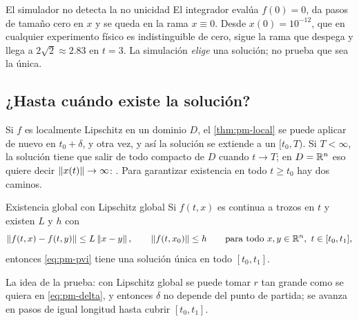 
\begin{trampa}[label=tr:pm-simulador]{El simulador no detecta la no unicidad}
El integrador evalúa $f(0)=0$, da pasos de tamaño cero en $x$ y se queda en la rama $x\equiv0$. Desde $x(0)=10^{-12}$, que en cualquier experimento físico es indistinguible de cero, sigue la rama que despega y llega a $2\sqrt2\approx2.83$ en $t=3$. La simulación \emph{elige} una solución; no prueba que sea la única.
\end{trampa}

\subsection{¿Hasta cuándo existe la solución?}

Si $f$ es localmente Lipschitz en un dominio $D$, el \cref{thm:pm-local} se puede aplicar de nuevo en $t_0+\delta$, y otra vez, y así la solución se extiende a un  $[t_0,T)$. Si $T<\infty$, la solución tiene que salir de todo compacto de $D$ cuando $t\to T$; en $D=\mathbb{R}^n$ eso quiere decir $\left\lVert x(t)\right\rVert\to\infty$: . Para garantizar existencia en todo $t\ge t_0$ hay dos caminos.

\begin{teorema}[label=thm:pm-global]{Existencia global con Lipschitz global \citep[Teorema~3.2]{Kha02}}
Si $f(t,x)$ es continua a trozos en $t$ y existen $L$ y $h$ con
\[
  \left\lVert f(t,x)-f(t,y)\right\rVert\le L\left\lVert x-y\right\rVert,\qquad\left\lVert f(t,x_0)\right\rVert\le h\qquad\text{para todo }x,y\in\mathbb{R}^n,\ t\in[t_0,t_1],
\]
entonces \eqref{eq:pm-pvi} tiene una solución única en todo $[t_0,t_1]$.
\end{teorema}

\noindent La idea de la prueba: con Lipschitz global se puede tomar $r$ tan grande como se quiera en \eqref{eq:pm-delta}, y entonces $\delta$ no depende del punto de partida; se avanza en pasos de igual longitud hasta cubrir $[t_0,t_1]$.

